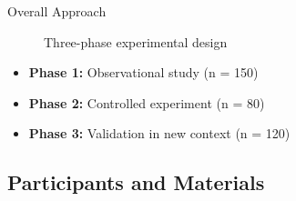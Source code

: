 \documentclass[aspectratio=169,11pt]{beamer}
\begin{document}
\begin{frame}{Overall Approach}
  \begin{figure}
    \centering
    \caption{Three-phase experimental design}
  \end{figure}

  \begin{itemize}
    \item \textbf{Phase 1:} Observational study (n = 150)
    \item \textbf{Phase 2:} Controlled experiment (n = 80)
    \item \textbf{Phase 3:} Validation in new context (n = 120)
  \end{itemize}
\end{frame}

\subsection{Participants and Materials}
\end{document}
